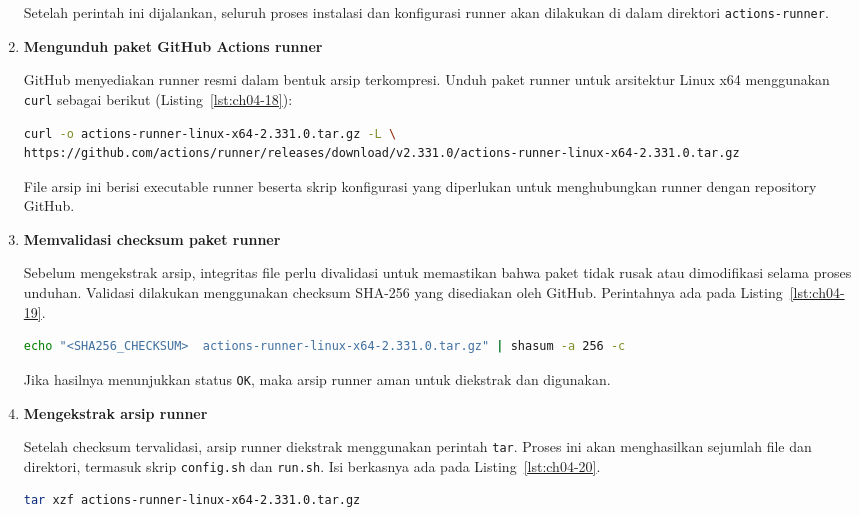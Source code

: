 \begin{enumerate}
Setelah perintah ini dijalankan, seluruh proses instalasi dan konfigurasi
runner akan dilakukan di dalam direktori \texttt{actions-runner}.

\item \textbf{Mengunduh paket GitHub Actions runner}

GitHub menyediakan runner resmi dalam bentuk arsip terkompresi.
Unduh paket runner untuk arsitektur Linux x64 menggunakan \texttt{curl}
sebagai berikut (Listing~\ref{lst:ch04-18}):

\begin{lstlisting}[language=bash, caption={Menguji layanan dengan curl (4)}, label={lst:ch04-18}]
curl -o actions-runner-linux-x64-2.331.0.tar.gz -L \
https://github.com/actions/runner/releases/download/v2.331.0/actions-runner-linux-x64-2.331.0.tar.gz
\end{lstlisting}

File arsip ini berisi executable runner beserta skrip konfigurasi yang
diperlukan untuk menghubungkan runner dengan repository GitHub.

\item \textbf{Memvalidasi checksum paket runner}

Sebelum mengekstrak arsip, integritas file perlu divalidasi untuk memastikan
bahwa paket tidak rusak atau dimodifikasi selama proses unduhan.
Validasi dilakukan menggunakan checksum SHA-256 yang disediakan oleh GitHub. Perintahnya ada pada Listing~\ref{lst:ch04-19}.

\begin{lstlisting}[language=bash, caption={Menampilkan keluaran di terminal}, label={lst:ch04-19}]
echo "<SHA256_CHECKSUM>  actions-runner-linux-x64-2.331.0.tar.gz" | shasum -a 256 -c
\end{lstlisting}

Jika hasilnya menunjukkan status \texttt{OK}, maka arsip runner aman untuk
diekstrak dan digunakan.

\item \textbf{Mengekstrak arsip runner}

Setelah checksum tervalidasi, arsip runner diekstrak menggunakan perintah
\texttt{tar}. Proses ini akan menghasilkan sejumlah file dan direktori,
termasuk skrip \texttt{config.sh} dan \texttt{run.sh}. Isi berkasnya ada pada Listing~\ref{lst:ch04-20}.

\begin{lstlisting}[language=bash, caption={Isi berkas config.sh}, label={lst:ch04-20}]
tar xzf actions-runner-linux-x64-2.331.0.tar.gz
\end{lstlisting}


\end{enumerate}
